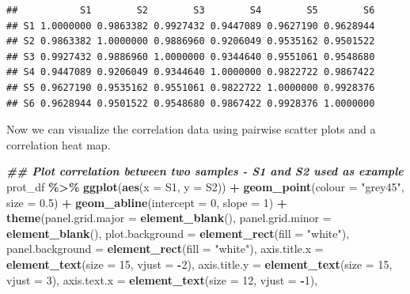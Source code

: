 \documentclass[9pt,a4paper,]{extarticle}
\newenvironment{Shaded}{\begin{snugshade}}{\end{snugshade}}
\newcommand{\AttributeTok}[1]{\textcolor[rgb]{0.13,0.29,0.53}{#1}}
\newcommand{\DecValTok}[1]{\textcolor[rgb]{0.00,0.00,0.81}{#1}}
\newcommand{\DocumentationTok}[1]{\textcolor[rgb]{0.56,0.35,0.01}{\textbf{\textit{#1}}}}
\newcommand{\FloatTok}[1]{\textcolor[rgb]{0.00,0.00,0.81}{#1}}
\newcommand{\FunctionTok}[1]{\textcolor[rgb]{0.13,0.29,0.53}{\textbf{#1}}}
\newcommand{\NormalTok}[1]{#1}
\newcommand{\SpecialCharTok}[1]{\textcolor[rgb]{0.81,0.36,0.00}{\textbf{#1}}}
\newcommand{\StringTok}[1]{\textcolor[rgb]{0.31,0.60,0.02}{#1}}
\begin{document}
\begin{verbatim}
##           S1        S2        S3        S4        S5        S6
## S1 1.0000000 0.9863382 0.9927432 0.9447089 0.9627190 0.9628944
## S2 0.9863382 1.0000000 0.9886960 0.9206049 0.9535162 0.9501522
## S3 0.9927432 0.9886960 1.0000000 0.9344640 0.9551061 0.9548680
## S4 0.9447089 0.9206049 0.9344640 1.0000000 0.9822722 0.9867422
## S5 0.9627190 0.9535162 0.9551061 0.9822722 1.0000000 0.9928376
## S6 0.9628944 0.9501522 0.9548680 0.9867422 0.9928376 1.0000000
\end{verbatim}

Now we can visualize the correlation data using pairwise scatter plots and a
correlation heat map.

\begin{Shaded}
\begin{Highlighting}[]
\DocumentationTok{\#\# Plot correlation between two samples {-} S1 and S2 used as example}
\NormalTok{prot\_df }\SpecialCharTok{\%\textgreater{}\%}
  \FunctionTok{ggplot}\NormalTok{(}\FunctionTok{aes}\NormalTok{(}\AttributeTok{x =} \StringTok{\textasciigrave{}}\AttributeTok{S1}\StringTok{\textasciigrave{}}\NormalTok{, }\AttributeTok{y =} \StringTok{\textasciigrave{}}\AttributeTok{S2}\StringTok{\textasciigrave{}}\NormalTok{)) }\SpecialCharTok{+}
  \FunctionTok{geom\_point}\NormalTok{(}\AttributeTok{colour =} \StringTok{"grey45"}\NormalTok{, }\AttributeTok{size =} \FloatTok{0.5}\NormalTok{) }\SpecialCharTok{+}
  \FunctionTok{geom\_abline}\NormalTok{(}\AttributeTok{intercept =} \DecValTok{0}\NormalTok{, }\AttributeTok{slope =} \DecValTok{1}\NormalTok{) }\SpecialCharTok{+}
  \FunctionTok{theme}\NormalTok{(}\AttributeTok{panel.grid.major =} \FunctionTok{element\_blank}\NormalTok{(), }
        \AttributeTok{panel.grid.minor =} \FunctionTok{element\_blank}\NormalTok{(),}
        \AttributeTok{plot.background =} \FunctionTok{element\_rect}\NormalTok{(}\AttributeTok{fill =} \StringTok{"white"}\NormalTok{),}
        \AttributeTok{panel.background =} \FunctionTok{element\_rect}\NormalTok{(}\AttributeTok{fill =} \StringTok{"white"}\NormalTok{),}
        \AttributeTok{axis.title.x =} \FunctionTok{element\_text}\NormalTok{(}\AttributeTok{size =} \DecValTok{15}\NormalTok{, }\AttributeTok{vjust =} \SpecialCharTok{{-}}\DecValTok{2}\NormalTok{),}
        \AttributeTok{axis.title.y =} \FunctionTok{element\_text}\NormalTok{(}\AttributeTok{size =} \DecValTok{15}\NormalTok{, }\AttributeTok{vjust =} \DecValTok{3}\NormalTok{),}
        \AttributeTok{axis.text.x =} \FunctionTok{element\_text}\NormalTok{(}\AttributeTok{size =} \DecValTok{12}\NormalTok{, }\AttributeTok{vjust =} \SpecialCharTok{{-}}\DecValTok{1}\NormalTok{),}

\end{Highlighting}
\end{Shaded}
\end{document}
